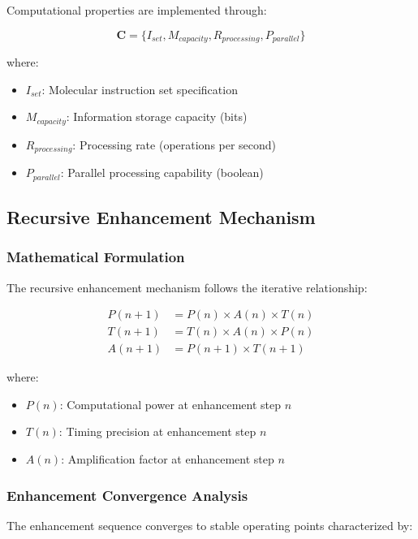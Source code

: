 Computational properties are implemented through:

\begin{equation}
\boldsymbol{C} = \{I_{set}, M_{capacity}, R_{processing}, P_{parallel}\}
\end{equation}

where:
\begin{itemize}
\item $I_{set}$: Molecular instruction set specification
\item $M_{capacity}$: Information storage capacity (bits)
\item $R_{processing}$: Processing rate (operations per second)
\item $P_{parallel}$: Parallel processing capability (boolean)
\end{itemize}

\subsection{Recursive Enhancement Mechanism}

\subsubsection{Mathematical Formulation}

The recursive enhancement mechanism follows the iterative relationship:

\begin{align}
P(n+1) &= P(n) \times A(n) \times T(n) \\
T(n+1) &= T(n) \times A(n) \times P(n) \\
A(n+1) &= P(n+1) \times T(n+1)
\end{align}

where:
\begin{itemize}
\item $P(n)$: Computational power at enhancement step $n$
\item $T(n)$: Timing precision at enhancement step $n$
\item $A(n)$: Amplification factor at enhancement step $n$
\end{itemize}

\subsubsection{Enhancement Convergence Analysis}

The enhancement sequence converges to stable operating points characterized by:

